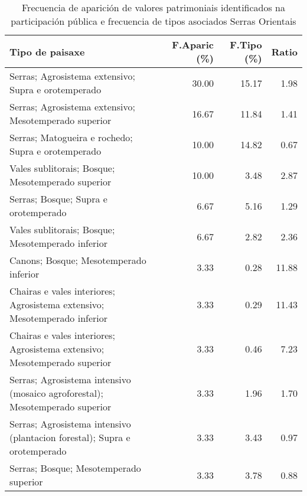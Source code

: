 \begin{table}[p]
\centering
\caption{Frecuencia de aparición de valores patrimoniais identificados na participación pública e frecuencia de tipos asociados Serras Orientais} 
\label{vsixotpat5}
\begin{tabular}{lrrr}
  \hline
Tipo de paisaxe & F.Aparic (\%) & F.Tipo (\%) & Ratio \\ 
  \hline
Serras; Agrosistema extensivo; Supra e orotemperado & 30.00 & 15.17 & 1.98 \\ 
  Serras; Agrosistema extensivo; Mesotemperado superior & 16.67 & 11.84 & 1.41 \\ 
  Serras; Matogueira e rochedo; Supra e orotemperado & 10.00 & 14.82 & 0.67 \\ 
  Vales sublitorais; Bosque; Mesotemperado superior & 10.00 & 3.48 & 2.87 \\ 
  Serras; Bosque; Supra e orotemperado & 6.67 & 5.16 & 1.29 \\ 
  Vales sublitorais; Bosque; Mesotemperado inferior & 6.67 & 2.82 & 2.36 \\ 
  Canons; Bosque; Mesotemperado inferior & 3.33 & 0.28 & 11.88 \\ 
  Chairas e vales interiores; Agrosistema extensivo; Mesotemperado inferior & 3.33 & 0.29 & 11.43 \\ 
  Chairas e vales interiores; Agrosistema extensivo; Mesotemperado superior & 3.33 & 0.46 & 7.23 \\ 
  Serras; Agrosistema intensivo (mosaico agroforestal); Mesotemperado superior & 3.33 & 1.96 & 1.70 \\ 
  Serras; Agrosistema intensivo (plantacion forestal); Supra e orotemperado & 3.33 & 3.43 & 0.97 \\ 
  Serras; Bosque; Mesotemperado superior & 3.33 & 3.78 & 0.88 \\ 
   \hline
\end{tabular}
\end{table}
